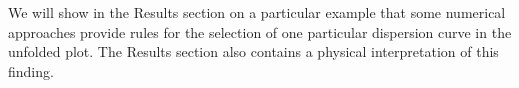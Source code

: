 We will show in the Results section on a particular example that some numerical approaches provide rules for the selection of one particular dispersion curve in the unfolded plot. The Results section also contains a physical interpretation of this finding.

% 

